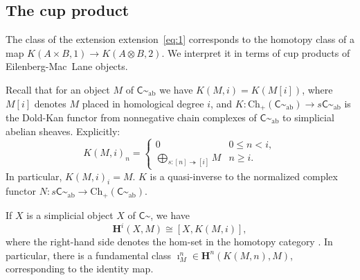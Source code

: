 \documentclass{amsart}
\numberwithin{equation}{subsection}
\theoremstyle{remark}
\theoremstyle{remark}
\newcommand{\C}{\mathsf{C}} %
\newcommand{\ch}{\mathrm{Ch}} %
\newcommand{\HH}{\mathbf{H}} %
\newcommand{\iso}{\cong}
\newcommand{\shC}{\C\sptilde} %
\newcommand{\shAbC}{\shC_\mathrm{ab}} %
\begin{document}
\subsection{The cup product}
\label{sec:cup}
The class of the extension extension~\eqref{eq:1} corresponds to the homotopy class of a map $K(A\times B,1)\to K(A\otimes B,2)$.  We interpret it in terms of cup products of Eilenberg-Mac~Lane objects. 

Recall that  for an object $M$ of $\shAbC$ we have $K(M,i)=K(M[i])$, where $M[i]$ denotes $M$ placed in homological degree $i$, and $K \colon \ch_+(\shAbC)\to s\shAbC$ is the Dold-Kan functor from nonnegative chain complexes of $\shAbC$ to simplicial abelian sheaves. Explicitly:
  \begin{equation*}
    K(M,i)_n =
    \begin{cases}
      0 & 0\leq n < i, \\
      \bigoplus_{s \colon [n] \twoheadrightarrow [i]} M & n\geq i.
    \end{cases}
  \end{equation*}
  In particular, $K(M,i)_i=M$. $K$ is a quasi-inverse to the normalized complex functor $N\colon s\shAbC\to \ch_+(\shAbC)$.

  If $X$ is a simplicial object $X$ of $\shC$, we have
  \begin{equation}
    \label{eq:5}
  \HH^i(X,M) \iso [X,K(M,i)],
\end{equation}
where the right-hand side denotes the hom-set in the homotopy category \cite{Illusie,Breen}. In particular, there is a  fundamental class $\imath_M^n\in \HH^n(K(M,n),M)$, corresponding to the identity map.
\end{document}

